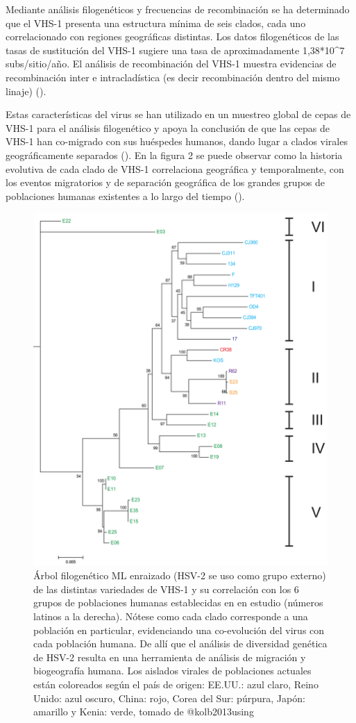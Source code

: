 \documentclass[
  12pt, krantz2,
  spanish,
]{krantz}
\begin{document}
Mediante análisis filogenéticos y frecuencias de recombinación se ha determinado que el VHS-1 presenta una estructura mínima de seis clados, cada uno correlacionado con regiones geográficas distintas. Los datos filogenéticos de las tasas de sustitución del VHS-1 sugiere una tasa de aproximadamente 1,38*10\^{}7 subs/sitio/año. El análisis de recombinación del VHS-1 muestra evidencias de recombinación inter e intracladística (es decir recombinación dentro del mismo linaje) (\citet{kolb2013using}).

Estas características del virus se han utilizado en un muestreo global de cepas de VHS-1 para el análisis filogenético y apoya la conclusión de que las cepas de VHS-1 han co-migrado con sus huéspedes humanos, dando lugar a clados virales geográficamente separados (\citet{kolb2013using}). En la figura 2 se puede observar como la historia evolutiva de cada clado de VHS-1 correlaciona geográfica y temporalmente, con los eventos migratorios y de separación geográfica de los grandes grupos de poblaciones humanas existentes a lo largo del tiempo (\citet{kolb2013using}).

\begin{figure}
\includegraphics[width=0.8\linewidth]{figures/VHS2} \caption{Árbol filogenético ML enraizado (HSV-2 se uso como grupo externo) de las distintas variedades de VHS-1 y su correlación con los 6 grupos de poblaciones humanas establecidas en en estudio (números latinos a la derecha). Nótese como cada clado corresponde a una población en particular, evidenciando una co-evolución del virus con cada población humana. De allí que el análisis de diversidad genética de HSV-2 resulta en  una herramienta de análisis de migración y biogeografía humana. Los aislados virales de poblaciones actuales están coloreados según el país de origen: EE.UU.: azul claro, Reino Unido: azul oscuro, China: rojo, Corea del Sur: púrpura, Japón: amarillo y Kenia: verde, tomado de @kolb2013using}\label{fig:sixcladesroot}
\end{figure}
\end{document}
